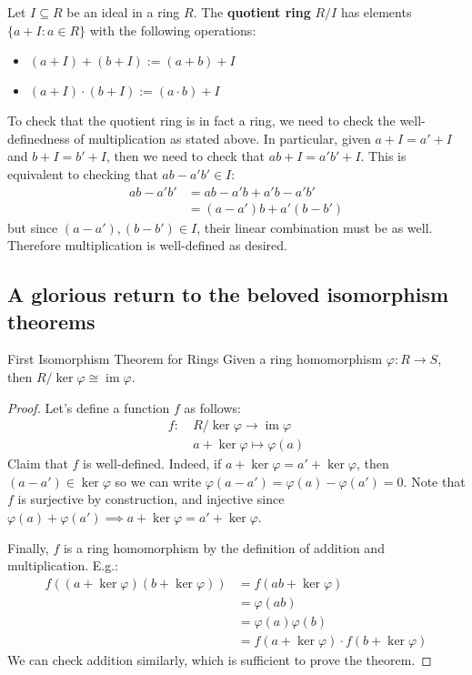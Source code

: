 \documentclass{article}
\theoremstyle{plain}
\newcommand{\on}[1]{\operatorname{#1}}
\begin{document}
\begin{definition}{}{}
Let $I \subseteq R$ be an ideal in a ring $R$. The \textbf{quotient ring} $R/I$ has elements $\{ a + I : a \in R \}$ with the following operations:
\begin{itemize}
\item $(a+I)+(b+I) := (a+b)+I$
\item $(a+I)\cdot(b+I) := (a\cdot b)+I$
\end{itemize} 
\end{definition}
To check that the quotient ring is in fact a ring, we need to check the well-definedness of multiplication as stated above. In particular, given $a+I = a' + I$ and $b+I = b' + I$, then we need to check that $ab + I = a'b' + I$. This is equivalent to checking that $ab-a'b' \in I$:
\begin{align*}
ab - a'b' &= ab - a'b + a'b - a'b' \\
&= (a-a')b + a'(b-b')
\end{align*}
but since $(a-a'), (b-b') \in I$, their linear combination must be as well. Therefore multiplication is well-defined as desired.


\subsection{A glorious return to the beloved isomorphism theorems}
\begin{theorem}{First Isomorphism Theorem for Rings}{}
Given a ring homomorphism $\varphi : R \to S$, then $R/\on{ker}\varphi \cong \on{im}\varphi$.
\end{theorem}
\begin{proof}
Let's define a function $f$ as follows:
\begin{align*}
f : \ &R/\on{ker}\varphi \to \on{im}\varphi \\
&a + \on{ker}\varphi \mapsto \varphi(a)
\end{align*}
Claim that $f$ is well-defined. Indeed, if $a + \on{ker}\varphi = a'+\on{ker}\varphi$, then $(a-a') \in \on{ker}\varphi$ so we can write $\varphi(a-a') = \varphi(a) - \varphi(a') = 0$. Note that $f$ is surjective by construction, and injective since $\varphi(a) + \varphi(a') \implies a + \ker\varphi = a' + \ker\varphi$.

Finally, $f$ is a ring homomorphism by the definition of addition and multiplication. E.g.:
\begin{align*}
f((a+\ker\varphi)(b+\ker\varphi))	&= f(ab + \ker\varphi) \\
						&= \varphi(ab) \\
						&= \varphi(a)\varphi(b) \\
						&= f(a+\ker\varphi)\cdot f(b+\ker\varphi)
\end{align*}
We can check addition similarly, which is sufficient to prove the theorem.
\end{proof}
\end{document}

